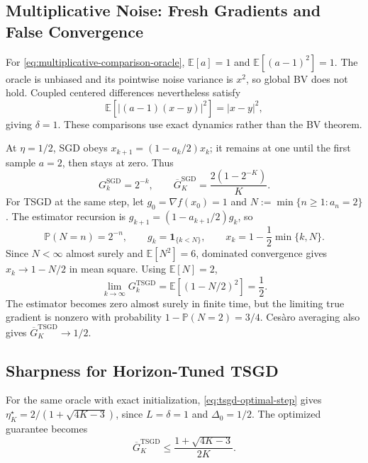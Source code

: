 \subsection{Multiplicative Noise: Fresh Gradients and False Convergence}
\label{app:multiplicative-details}

For \eqref{eq:multiplicative-comparison-oracle},
$\mathbb E[a]=1$ and $\mathbb E[(a-1)^2]=1$. The oracle is
unbiased and its pointwise noise variance is $x^2$, so global BV
does not hold. Coupled centered differences nevertheless satisfy
\[
\mathbb E[|(a-1)(x-y)|^2]=|x-y|^2,
\]
giving $\delta=1$. These comparisons use exact dynamics rather
than the BV theorem.

At $\eta=1/2$, SGD obeys $x_{k+1}=(1-a_k/2)x_k$;
it remains at one until the first sample $a=2$, then stays at zero.
Thus
\begin{equation}
\label{eq:multiplicative-sgd-exact}
\boxed{G_k^{\mathrm{SGD}}=2^{-k},\qquad
\overline G_K^{\mathrm{SGD}}=\frac{2(1-2^{-K})}{K}.}
\end{equation}
For TSGD at the same step, let $g_0=\nabla f(x_0)=1$ and
$N:=\min\{n\geq1:a_n=2\}$. The estimator recursion is
$g_{k+1}=(1-a_{k+1}/2)g_k$, so
\[
\mathbb P(N=n)=2^{-n},\qquad
g_k=\boldsymbol 1_{\{k<N\}},\qquad
x_k=1-\frac12\min\{k,N\}.
\]
Since $N<\infty$ almost surely and $\mathbb E[N^2]=6$,
dominated convergence gives $x_k\to1-N/2$ in mean square.
Using $\mathbb E[N]=2$,
\begin{equation}
\label{eq:multiplicative-tsgd-residual}
\boxed{\lim_{k\to\infty}G_k^{\mathrm{TSGD}}
=\mathbb E[(1-N/2)^2]=\frac12.}
\end{equation}
The estimator becomes zero almost surely in finite time, but the
limiting true gradient is nonzero with probability
$1-\mathbb P(N=2)=3/4$. Ces\`aro averaging also gives
$\overline G_K^{\mathrm{TSGD}}\to1/2$.

\subsection{Sharpness for Horizon-Tuned TSGD}
\label{app:proof-multiplicative-tsgd-tuned}

For the same oracle with exact initialization,
\eqref{eq:tsgd-optimal-step} gives
$\eta_K^\star=2/(1+\sqrt{4K-3})$, since
$L=\delta=1$ and $\Delta_0=1/2$.
The optimized guarantee becomes
\begin{equation}
\label{eq:multiplicative-tsgd-tuned-bound}
\overline G_K^{\mathrm{TSGD}}
\leq\frac{1+\sqrt{4K-3}}{2K}.
\end{equation}

